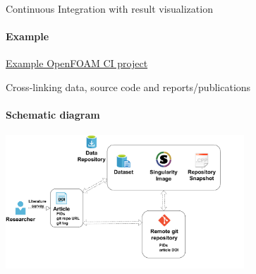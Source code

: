 \documentclass[
	aspectratio=169,%
	color={accentcolor=2d},
	logo=true,%
	colorframetitle=true,%
	]{tudabeamer}
\begin{document}
\begin{frame}{Continuous Integration with result visualization} 
    \framesubtitle{Example}

    \vfill
    \begin{center}
        \href{https://gitlab.com/tmaric/fvc-reconstruct/-/pipelines/279564790}{Example OpenFOAM CI project} 
    \end{center}

\end{frame}

\begin{frame}{Cross-linking data, source code and reports/publications} 
	\framesubtitle{Schematic diagram}
	
	\begin{center}
		\includegraphics[width=0.67\textwidth]{figures/cross-linking.pdf}
	\end{center}

\end{frame}
\end{document}
